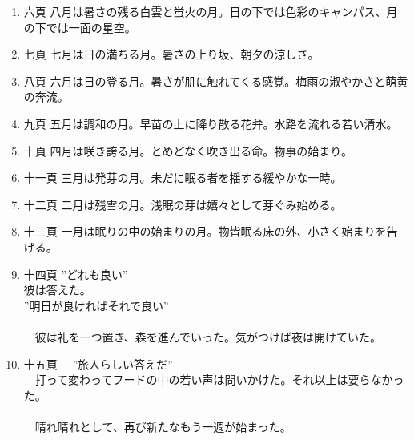 \documentclass{tarticle}
\begin{document}
\begin{enumerate}
\item 六頁
\label{sec:org2daab7e}
\newline
八月は暑さの残る白雲と蛍火の月。日の下では色彩のキャンパス、月の下では一面の星空。\\

\item 七頁
\label{sec:org562f9be}
\newline
七月は日の満ちる月。暑さの上り坂、朝夕の涼しさ。\\

\item 八頁
\label{sec:org3ed7712}
\newline
六月は日の登る月。暑さが肌に触れてくる感覚。梅雨の淑やかさと萌黄の奔流。\\

\item 九頁
\label{sec:org7842dd7}
\newline
五月は調和の月。早苗の上に降り散る花弁。水路を流れる若い清水。\\

\item 十頁
\label{sec:org5e0374e}
\newline
四月は咲き誇る月。とめどなく吹き出る命。物事の始まり。\\

\item 十一頁
\label{sec:orgd05f71c}
\newline
三月は発芽の月。未だに眠る者を揺する緩やかな一時。\\

\item 十二頁
\label{sec:orgb2b5436}
\newline
二月は残雪の月。浅眠の芽は嬉々として芽ぐみ始める。\\

\item 十三頁
\label{sec:orgd5e09c1}
\newline
一月は眠りの中の始まりの月。物皆眠る床の外、小さく始まりを告げる。\\

\item 十四頁
\label{sec:org956e0e1}
\newline
  ”どれも良い”\\
彼は答えた。\\
”明日が良ければそれで良い”\\
　\\
　彼は礼を一つ置き、森を進んでいった。気がつけば夜は開けていた。\\
\item 十五頁
\label{sec:orgf734d44}
\newline
　”旅人らしい答えだ”\\
　打って変わってフードの中の若い声は問いかけた。それ以上は要らなかった。\\
　\\
　晴れ晴れとして、再び新たなもう一週が始まった。\\
\end{enumerate}
\end{document}
